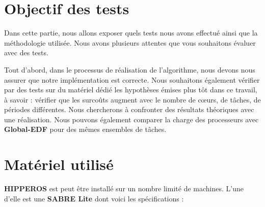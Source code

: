 \section{Objectif des tests}

	Dans cette partie, nous allons exposer quels tests nous avons effectué ainsi que 
	la méthodologie utilisée.
	Nous avons plusieurs attentes que vous souhaitons évaluer avec des tests. \newline
	 
	Tout d'abord, dans le processus de réalisation de l'algorithme, nous devons nous assurer 
	que notre implémentation est correcte. Nous souhaitons également vérifier par des tests 
	sur du matériel dédié les hypothèses émises  plus tôt dans ce travail, 
	à savoir : vérifier que les surcoûts augment avec le nombre de cœurs, de tâches, 
	de périodes différentes. 
	Nous chercherons à confronter des résultats théoriques avec une réalisation.
	Nous pouvons également comparer la charge des processeurs avec \textbf{Global-EDF} pour des mêmes ensembles de tâches.

	

\section{Matériel utilisé}
	\textbf{HIPPEROS} est peut être installé sur un nombre limité de machines. 
	L'une d'elle est une \textbf{SABRE Lite} dont voici les spécifications :
	

